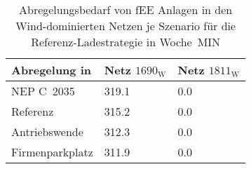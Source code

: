 {
\renewcommand{\arraystretch}{1.2}%
\begin{table}[H]
	\begin{center}
		\caption{Abregelungsbedarf von fEE Anlagen in den Wind-dominierten Netzen je Szenario für die Referenz-Ladestrategie in Woche~MIN}
		\begin{tabu} to 0.6\textwidth {X[1.5] X[1, r] X[1, r]}
			\toprule
			Abregelung in   \si{\mwh}    & Netz \(1690_{\text{W}}\) & Netz \(1811_{\text{W}}\) \\ \midrule
			NEP C~\num{2035}             & \num{319.1}     & \num{0.0}       \\
			Referenz                     & \num{315.2}     & \num{0.0}       \\
			Antriebswende                & \num{312.3}     & \num{0.0}       \\
			\glqq Firmenparkplatz\grqq{} & \num{311.9}     & \num{0.0}       \\ \bottomrule
		\end{tabu}
		\label{tab:wind_dominated_week_a_fee_cur}
	\end{center}
	\vspace{-3mm}%
\end{table}
}
